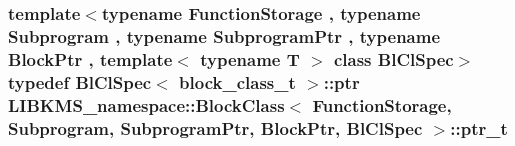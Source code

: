 \hypertarget{classLIBKMS__namespace_1_1BlockClass_a37593e298865c9e7050501f7ef176c91}{
\subsubsection[{ptr\-\_\-t}]{\setlength{\rightskip}{0pt plus 5cm}template$<$typename Function\-Storage , typename Subprogram , typename Subprogram\-Ptr , typename Block\-Ptr , template$<$ typename T $>$ class Bl\-Cl\-Spec$>$ typedef Bl\-Cl\-Spec$<$ {\bf block\-\_\-class\-\_\-t} $>$\-::ptr {\bf L\-I\-B\-K\-M\-S\-\_\-namespace\-::\-Block\-Class}$<$ {\bf Function\-Storage}, {\bf Subprogram}, Subprogram\-Ptr, Block\-Ptr, Bl\-Cl\-Spec $>$\-::{\bf ptr\-\_\-t}}}\label{classLIBKMS__namespace_1_1BlockClass_a37593e298865c9e7050501f7ef176c91}


